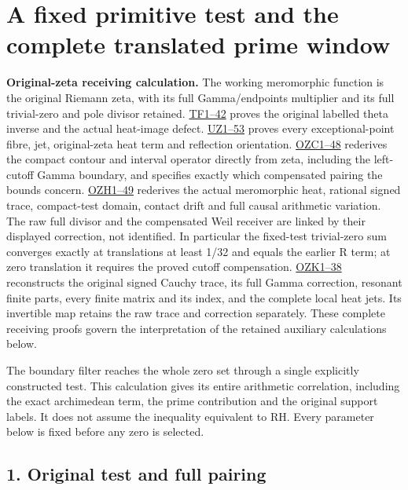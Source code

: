 \documentclass[
  10pt,
  a4paper,
]{article}
\author{}
\date{}
\begin{document}
{
\setcounter{tocdepth}{3}
\tableofcontents
}
\section{A fixed primitive test and the complete translated prime
window}\label{a-fixed-primitive-test-and-the-complete-translated-prime-window}

\textbf{Original-zeta receiving calculation.} The working meromorphic
function is the original Riemann zeta, with its full Gamma/endpoints
multiplier and its full trivial-zero and pole divisor retained.
\href{FAITHFUL_THETA_COMPLETION_RETURN.md}{TF1--42} proves the original
labelled theta inverse and the actual heat-image defect.
\href{FAITHFUL_UNCOMPLETED_ZETA_HEAT.md}{UZ1--53} proves every
exceptional-point fibre, jet, original-zeta heat term and reflection
orientation.
\href{ORIGINAL_ZETA_COMPACT_WEIL_RECONSTRUCTION.md}{OZC1--48} rederives
the compact contour and interval operator directly from zeta, including
the left-cutoff Gamma boundary, and specifies exactly which compensated
pairing the bounds concern.
\href{ORIGINAL_ZETA_HEAT_CONTACT_RECONSTRUCTION.md}{OZH1--49} rederives
the actual meromorphic heat, rational signed trace, compact-test domain,
contact drift and full causal arithmetic variation. The raw full divisor
and the compensated Weil receiver are linked by their displayed
correction, not identified. In particular the fixed-test trivial-zero
sum converges exactly at translations at least 1/32 and equals the
earlier R term; at zero translation it requires the proved cutoff
compensation. \href{ORIGINAL_ZETA_CAUCHY_RECONSTRUCTION.md}{OZK1--38}
reconstructs the original signed Cauchy trace, its full Gamma
correction, resonant finite parts, every finite matrix and its index,
and the complete local heat jets. Its invertible map retains the raw
trace and correction separately. These complete receiving proofs govern
the interpretation of the retained auxiliary calculations below.

The boundary filter reaches the whole zero set through a single
explicitly constructed test. This calculation gives its entire
arithmetic correlation, including the exact archimedean term, the prime
contribution and the original support labels. It does not assume the
inequality equivalent to RH. Every parameter below is fixed before any
zero is selected.

\subsection{1. Original test and full
pairing}\label{original-test-and-full-pairing}
\end{document}
